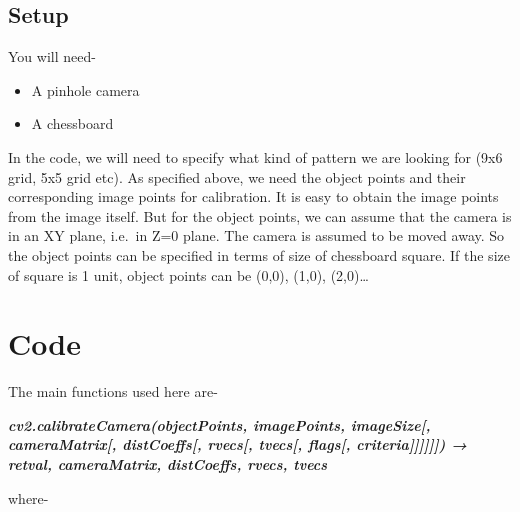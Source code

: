 \documentclass[]{article}
\begin{document}
\subsection{Setup}\label{setup}

You will need- 
\begin{itemize}
	\item A pinhole camera
	\item A chessboard
\end{itemize}

In the code, we will need to specify what kind of pattern we are looking
for (9x6 grid, 5x5 grid etc). As specified above, we need the object
points and their corresponding image points for calibration. It is easy
to obtain the image points from the image itself. But for the object
points, we can assume that the camera is in an XY plane, i.e.~in Z=0
plane. The camera is assumed to be moved away. So the object points can
be specified in terms of size of chessboard square. If the size of
square is 1 unit, object points can be (0,0), (1,0), (2,0)\ldots{}

\section{Code}\label{code}

The main functions used here are-

\emph{\textbf{cv2.calibrateCamera(objectPoints, imagePoints,
imageSize{[}, cameraMatrix{[}, distCoeffs{[}, rvecs{[}, tvecs{[},
flags{[}, criteria{]}{]}{]}{]}{]}{]}) → retval, cameraMatrix,
distCoeffs, rvecs, tvecs}}

where-
\end{document}
